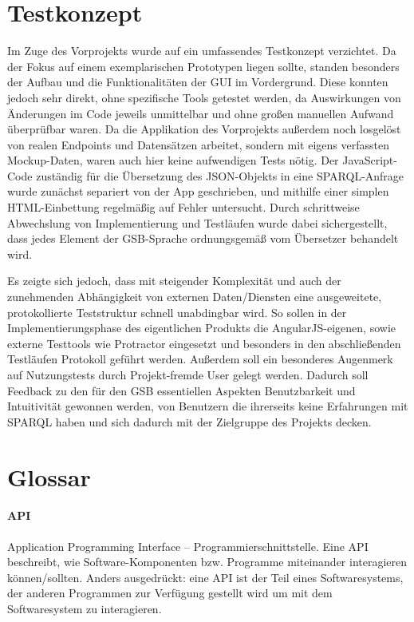 
\section{Testkonzept}

Im Zuge des Vorprojekts wurde auf ein umfassendes Testkonzept
verzichtet.
Da der Fokus auf einem exemplarischen Prototypen liegen
sollte, standen besonders der Aufbau und die Funktionalitäten der GUI
im Vordergrund.
Diese konnten jedoch sehr direkt, ohne spezifische
Tools getestet werden, da Auswirkungen von Änderungen im Code jeweils
unmittelbar und ohne großen manuellen Aufwand überprüfbar waren.
Da die Applikation des Vorprojekts außerdem noch losgelöst von realen Endpoints und Datensätzen arbeitet, sondern mit eigens verfassten Mockup-Daten, waren auch hier keine aufwendigen Tests nötig.
Der JavaScript-Code zuständig für die Übersetzung des JSON-Objekts in
eine SPARQL-Anfrage wurde zunächst separiert von der App geschrieben,
und mithilfe einer simplen HTML-Einbettung regelmäßig auf Fehler
untersucht.
Durch schrittweise Abwechslung von Implementierung und Testläufen wurde dabei sichergestellt, dass jedes Element der GSB-Sprache ordnungsgemäß vom Übersetzer behandelt wird.

Es zeigte sich jedoch, dass mit steigender Komplexität und auch der
zunehmenden Abhängigkeit von externen Daten/Diensten eine
ausgeweitete, protokollierte Teststruktur schnell unabdingbar wird.
So
sollen in der Implementierungsphase des eigentlichen Produkts die
AngularJS-eigenen, sowie externe Testtools wie Protractor eingesetzt
und besonders in den abschließenden Testläufen Protokoll geführt
werden.
Außerdem soll ein besonderes Augenmerk auf Nutzungstests durch
Projekt-fremde User gelegt werden. Dadurch soll Feedback zu den für
den GSB essentiellen Aspekten Benutzbarkeit und Intuitivität gewonnen
werden, von Benutzern die ihrerseits keine Erfahrungen mit SPARQL
haben und sich dadurch mit der Zielgruppe des Projekts decken.

\section{Glossar}

\newcommand{\begriff}[2]{
\paragraph{#1}
#2
}

\begriff{API}
{Application Programming Interface -- Programmierschnittstelle.
Eine API be\hack{-\break}schreibt, wie Software-Komponenten bzw. Programme miteinander interagieren können/sollten. Anders ausgedrückt: eine API ist der Teil eines Softwaresystems, der anderen Programmen zur Verfügung gestellt wird um mit dem Softwaresystem zu interagieren.}

